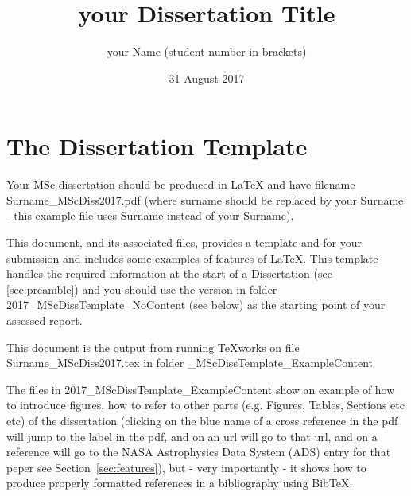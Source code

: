 \documentclass[twoside,fontsize=12pt,
     bibliography=totoc, %
     listof=totoc, %
     index=totoc, %
     onehalfspacing %
]{_MScDiss2017_cls}
\title{your Dissertation Title}
\author{your Name (student number in brackets) }
\date{31 August 2017}
\begin{document}
\setcounter{tocdepth}{5}

\maketitle
{}
\tableofcontents %
\listoffigures %
\listoftables %

\newpage%
\cleardoublepage
{}%


\chapter{The Dissertation Template}
\label{sec:template}
Your MSc dissertation should be produced in LaTeX and have filename \newline Surname\_MScDiss2017.pdf (where surname should be replaced by your Surname - this example file uses Surname instead of your Surname).

This document, and its associated files, provides a template and for your submission and includes some examples of features of \LaTeX. 
This template handles the required information at the start of a Dissertation (see \ref{sec:preamble}) and you should use the  version in folder 2017\_MScDissTemplate\_NoContent (see below) as the starting point of your assessed report. 

This document is the output from running TeXworks on file \newline  Surname\_MScDiss2017.tex \newline in folder \_MScDissTemplate\_ExampleContent

The files in 2017\_MScDissTemplate\_ExampleContent show an example of how to introduce figures, how to refer to other parts (e.g. Figures, Tables, Sections etc etc) of the dissertation (clicking on the blue name of a cross reference in the pdf will jump to the label in the pdf, and on an url will go to that url, and on a reference will go to the NASA Astrophysics Data System (ADS) entry for that peper see 
Section~\ref{sec:features}), but - very importantly - it shows how to produce properly formatted references in a bibliography using BibTeX. 
\end{document}
